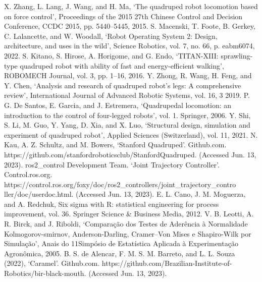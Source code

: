 \documentclass[conference]{IEEEtran}
\begin{document}
\begin{thebibliography}{00}
   X. Zhang, L. Lang, J. Wang, and H. Ma, ‘The quadruped robot locomotion based on force control’, Proceedings of the 2015 27th Chinese Control and Decision Conference, CCDC 2015, pp. 5440–5445, 2015.
   S. Macenski, T. Foote, B. Gerkey, C. Lalancette, and W. Woodall, ‘Robot Operating System 2: Design, architecture, and uses in the wild’, Science Robotics, vol. 7, no. 66, p. eabm6074, 2022.
   S. Kitano, S. Hirose, A. Horigome, and G. Endo, ‘TITAN-XIII: sprawling-type quadruped robot with ability of fast and energy-efficient walking’, ROBOMECH Journal, vol. 3, pp. 1–16, 2016.
   Y. Zhong, R. Wang, H. Feng, and Y. Chen, ‘Analysis and research of quadruped robot’s legs: A comprehensive review’, International Journal of Advanced Robotic Systems, vol. 16, 3 2019.
   P. G. De Santos, E. Garcia, and J. Estremera, ‘Quadrupedal locomotion: an introduction to the control of four-legged robots’, vol. 1. Springer, 2006.
   Y. Shi, S. Li, M. Guo, Y. Yang, D. Xia, and X. Luo, ‘Structural design, simulation and experiment of quadruped robot’, Applied Sciences (Switzerland), vol. 11, 2021.
   N. Kau, A. Z. Schultz, and M. Bowers, ‘Stanford Quadruped’. Github.com. https://github.com/stanfordroboticsclub/StanfordQuadruped. (Accessed Jun. 13, 2023).
   ros2\_control Development Team. ‘Joint Trajectory Controller’. Control.ros.org. https://control.ros.org/foxy/doc/ros2\_controllers/joint\_trajectory\_contro
  ller/doc/userdoc.html. (Accessed Jun. 13, 2023).
   E. L. Cano, J. M. Moguerza, and A. Redchuk, Six sigma with R: statistical engineering for process improvement, vol. 36. Springer Science \& Business Media, 2012.
   V. B. Leotti, A. R. Birck, and J. Riboldi, ‘Comparação dos Testes de Aderência à Normalidade Kolmogorov-smirnov, Anderson-Darling, Cramer--Von Mises e Shapiro-Wilk por Simulação’, Anais do 11\textordmasculine Simpósio de Estatística Aplicada à Experimentação Agronômica, 2005.
   B. S. de Alencar, F. M. S. M. Barreto, and L. L. Souza (2022), ‘Caramel’. Github.com. https://github.com/Brazilian-Institute-of-Robotics/bir-black-mouth. (Accessed Jun. 13, 2023).



\end{thebibliography}
\end{document}
